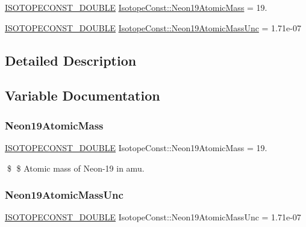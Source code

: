 \begin{DoxyCompactItemize}
\item 
\mbox{\hyperlink{group___isotope_const-_macros_ga8f45a7272ce02c0b4c65c44636ed719a}{I\+S\+O\+T\+O\+P\+E\+C\+O\+N\+S\+T\+\_\+\+D\+O\+U\+B\+LE}} \mbox{\hyperlink{group___isotope_const-_neon-_ne19_gaa039bb396070b81696665839f373c7c3}{Isotope\+Const\+::\+Neon19\+Atomic\+Mass}} = 19.
\item 
\mbox{\hyperlink{group___isotope_const-_macros_ga8f45a7272ce02c0b4c65c44636ed719a}{I\+S\+O\+T\+O\+P\+E\+C\+O\+N\+S\+T\+\_\+\+D\+O\+U\+B\+LE}} \mbox{\hyperlink{group___isotope_const-_neon-_ne19_ga246e05e4e9c59c08e22250b07ee6cdca}{Isotope\+Const\+::\+Neon19\+Atomic\+Mass\+Unc}} = 1.\+71e-\/07
\end{DoxyCompactItemize}


\subsection{Detailed Description}


\subsection{Variable Documentation}
\mbox{\label{group___isotope_const-_neon-_ne19_gaa039bb396070b81696665839f373c7c3}} 
\subsubsection{\texorpdfstring{Neon19\+Atomic\+Mass}{Neon19AtomicMass}}
{\footnotesize\ttfamily \mbox{\hyperlink{group___isotope_const-_macros_ga8f45a7272ce02c0b4c65c44636ed719a}{I\+S\+O\+T\+O\+P\+E\+C\+O\+N\+S\+T\+\_\+\+D\+O\+U\+B\+LE}} Isotope\+Const\+::\+Neon19\+Atomic\+Mass = 19.}

\$ \$ Atomic mass of Neon-\/19 in amu. \mbox{\label{group___isotope_const-_neon-_ne19_ga246e05e4e9c59c08e22250b07ee6cdca}} 
\subsubsection{\texorpdfstring{Neon19\+Atomic\+Mass\+Unc}{Neon19AtomicMassUnc}}
{\footnotesize\ttfamily \mbox{\hyperlink{group___isotope_const-_macros_ga8f45a7272ce02c0b4c65c44636ed719a}{I\+S\+O\+T\+O\+P\+E\+C\+O\+N\+S\+T\+\_\+\+D\+O\+U\+B\+LE}} Isotope\+Const\+::\+Neon19\+Atomic\+Mass\+Unc = 1.\+71e-\/07}


